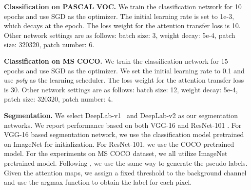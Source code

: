 \documentclass[10pt,twocolumn,letterpaper]{article}
\newcommand{\myParaP}[1]{\vspace{.05in}\noindent\textbf{#1}}
\begin{document}
\myParaP{Classification on PASCAL VOC.}
We train the classification network for 10 epochs 
and use SGD as the optimizer.
The initial learning rate is set to 1e-3, 
which decays at the  epoch.
The loss weight  for the attention transfer 
loss is 10.
Other network settings are as follows:
batch size: 3, weight decay: 5e-4, patch 
size: 320320, patch number: 6.



\myParaP{Classification on MS COCO.}
We train the classification network for 15 epochs 
and use SGD as the optimizer.
We set the initial learning rate to 0.1 
and use \emph{poly} as the learning scheduler.
The loss weight  for the attention transfer 
loss is 30.
Other network settings are as follows:
batch size: 12, weight decay: 5e-4, 
patch size: 320320, patch number: 4.



\myParaP{Segmentation.}
We select DeepLab-v1~\cite{chen2014semantic} 
and DeepLab-v2 \cite{chen2017deeplab} 
as our segmentation networks.
We report performance based on both VGG-16 \cite{simonyan2014very} 
and ResNet-101 \cite{he2016deep}.
For VGG-16 based segmentation network, we use the classification 
model pretrained on ImageNet \cite{deng2009large} 
for initialization.
For ResNet-101, we use the COCO pretrained model. 
For the experiments on MS COCO dataset, we all 
utilize ImageNet pretrained model.
Following \cite{lee2021railroad}, we use the 
same way to generate 
the pseudo labels.
Given the attention maps, we assign a 
fixed threshold to the background channel 
and use the argmax function to obtain the label 
for each pixel.
\end{document}
